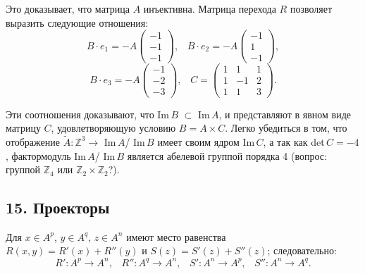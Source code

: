 {\noindent Это доказывает, что матрица $A$ инъективна. Матрица перехода $R$ позволяет выразить следующие отношения:
\begin{equation*}
B \cdot e_{1} = -A \begin{pmatrix} -1 \\ -1 \\ -1 \end{pmatrix},\;\;\;B \cdot e_{2} = -A \begin{pmatrix} -1 \\ 1 \\ -1 \end{pmatrix},
\end{equation*}
\begin{equation*}
B \cdot e_{3} = -A \begin{pmatrix} -1 \\ -2 \\ -3 \end{pmatrix},\;\;\;C = \begin{pmatrix} 1 & 1 & 1 \\ 1 & -1 & 2 \\ 1 & 1 & 3 \end{pmatrix}.
\end{equation*}

\noindent Эти соотношения доказывают, что Im{$\,B$} $\subset$ Im{$\,A$}, и представляют в явном виде матрицу $C$, удовлетворяющую условию $B = A \times C$. Легко убедиться в том, что отображение $\tilde{A} : \mathbb {Z}^3 \rightarrow$ Im{$\,A$}/ Im{$\,B$} имеет своим ядром Im{$\,C$}, а так как det${\,C} = -4$, фактормодуль Im{$\,A$}/ Im{$\,B$} является абелевой группой порядка 4 (вопрос: группой $\mathbb {Z}_{4}$ или $\mathbb {Z}_2 \times \mathbb {Z}_2$?).




\subsection{\normalsize{15. Проекторы}}

Для $x \in A^{p}$, $y \in A^{q}$, $z \in A^{n}$ имеют место равенства $R(x, y) = R'(x) + R''(y)$ и $S(z) = S'(z) + S''(z)$; следовательно:
\begin{equation*}
R' : A^{p} \rightarrow A^{n},\;\;\;R'' : A^{q} \rightarrow A^{n},\;\;\;S' : A^{n} \rightarrow A^{p},\;\;\;S'' : A^{n} \rightarrow A^{q}.
\end{equation*}

}

